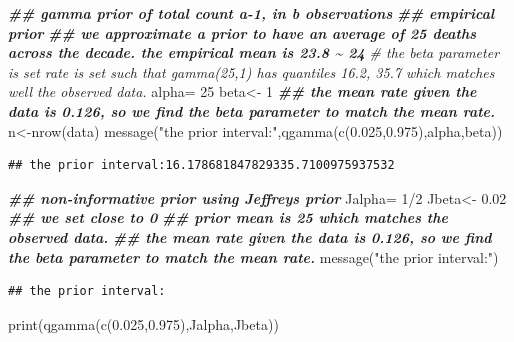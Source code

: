\documentclass[
]{book}
\newenvironment{Shaded}{\begin{snugshade}}{\end{snugshade}}
\newcommand{\CommentTok}[1]{\textcolor[rgb]{0.56,0.35,0.01}{\textit{#1}}}
\newcommand{\DecValTok}[1]{\textcolor[rgb]{0.00,0.00,0.81}{#1}}
\newcommand{\DocumentationTok}[1]{\textcolor[rgb]{0.56,0.35,0.01}{\textbf{\textit{#1}}}}
\newcommand{\FloatTok}[1]{\textcolor[rgb]{0.00,0.00,0.81}{#1}}
\newcommand{\FunctionTok}[1]{\textcolor[rgb]{0.00,0.00,0.00}{#1}}
\newcommand{\NormalTok}[1]{#1}
\newcommand{\OtherTok}[1]{\textcolor[rgb]{0.56,0.35,0.01}{#1}}
\newcommand{\SpecialCharTok}[1]{\textcolor[rgb]{0.00,0.00,0.00}{#1}}
\newcommand{\StringTok}[1]{\textcolor[rgb]{0.31,0.60,0.02}{#1}}
\theoremstyle{definition}
\theoremstyle{definition}
\theoremstyle{definition}
\theoremstyle{definition}
\theoremstyle{remark}
\begin{document}
\begin{Shaded}
\begin{Highlighting}[]
 \DocumentationTok{\#\# gamma prior of total count a{-}1,  in b observations }
 \DocumentationTok{\#\# empirical prior}
 \DocumentationTok{\#\# we approximate a prior to have an average of 25 deaths across the decade.  the empirical mean is 23.8 \textasciitilde{} 24}
 \CommentTok{\#  the beta parameter is set rate is set such that gamma(25,1) has quantiles  16.2, 35.7 which matches well the observed data.}
\NormalTok{   alpha}\OtherTok{=} \DecValTok{25}
\NormalTok{   beta}\OtherTok{\textless{}{-}} \DecValTok{1}
   \DocumentationTok{\#\# the mean rate given the data is 0.126, so we find the beta parameter to match the mean rate.}
\NormalTok{   n}\OtherTok{\textless{}{-}}\FunctionTok{nrow}\NormalTok{(data)}
 \FunctionTok{message}\NormalTok{(}\StringTok{"the prior interval:"}\NormalTok{,}\FunctionTok{qgamma}\NormalTok{(}\FunctionTok{c}\NormalTok{(}\FloatTok{0.025}\NormalTok{,}\FloatTok{0.975}\NormalTok{),alpha,beta))}
\end{Highlighting}
\end{Shaded}

\begin{verbatim}
## the prior interval:16.178681847829335.7100975937532
\end{verbatim}

\begin{Shaded}
\begin{Highlighting}[]
\DocumentationTok{\#\# non{-}informative prior using Jeffrey\textquotesingle{}s prior}
\NormalTok{  Jalpha}\OtherTok{=} \DecValTok{1}\SpecialCharTok{/}\DecValTok{2}
\NormalTok{   Jbeta}\OtherTok{\textless{}{-}} \FloatTok{0.02} \DocumentationTok{\#\# we set close to 0}
    \DocumentationTok{\#\# prior mean is 25 which matches the observed data.}
   \DocumentationTok{\#\# the mean rate given the data is 0.126, so we find the beta parameter to match the mean rate.}
\FunctionTok{message}\NormalTok{(}\StringTok{"the prior interval:"}\NormalTok{)}
\end{Highlighting}
\end{Shaded}

\begin{verbatim}
## the prior interval:
\end{verbatim}

\begin{Shaded}
\begin{Highlighting}[]
 \FunctionTok{print}\NormalTok{(}\FunctionTok{qgamma}\NormalTok{(}\FunctionTok{c}\NormalTok{(}\FloatTok{0.025}\NormalTok{,}\FloatTok{0.975}\NormalTok{),Jalpha,Jbeta))}
\end{Highlighting}
\end{Shaded}
\end{document}
